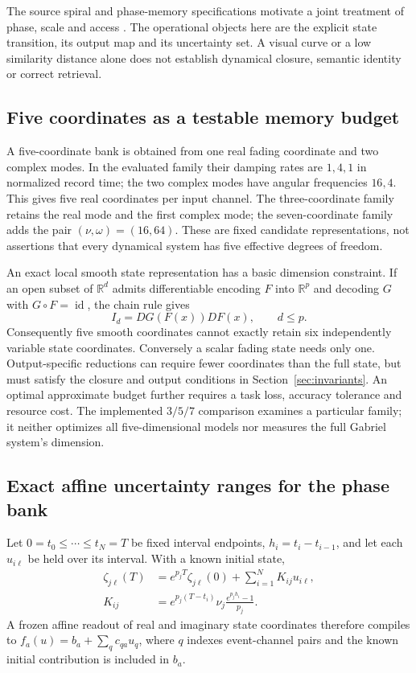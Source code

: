 \documentclass[11pt,a4paper]{article}
\theoremstyle{definition}\newtheorem{definition}[theorem]{Definition}
\newcommand{\R}{\mathbb{R}}
\begin{document}
The source spiral and phase-memory specifications motivate a joint treatment of phase, scale and access \cite{klemm2025oriphiel,klemm2025spiral}. The operational objects here are the explicit state transition, its output map and its uncertainty set. A visual curve or a low similarity distance alone does not establish dynamical closure, semantic identity or correct retrieval.

\subsection{Five coordinates as a testable memory budget}
A five-coordinate bank is obtained from one real fading coordinate and two complex modes. In the evaluated family their damping rates are $1,4,1$ in normalized record time; the two complex modes have angular frequencies $16,4$. This gives five real coordinates per input channel. The three-coordinate family retains the real mode and the first complex mode; the seven-coordinate family adds the pair $(\nu,\omega)=(16,64)$. These are fixed candidate representations, not assertions that every dynamical system has five effective degrees of freedom.

An exact local smooth state representation has a basic dimension constraint. If an open subset of $\R^d$ admits differentiable encoding $F$ into $\R^p$ and decoding $G$ with $G\circ F=\operatorname{id}$, the chain rule gives
\begin{equation}
 I_d=DG(F(x))DF(x),\qquad d\leq p.\label{eq:dimensionbound}
\end{equation}
Consequently five smooth coordinates cannot exactly retain six independently variable state coordinates. Conversely a scalar fading state needs only one. Output-specific reductions can require fewer coordinates than the full state, but must satisfy the closure and output conditions in Section~\ref{sec:invariants}. An optimal approximate budget further requires a task loss, accuracy tolerance and resource cost. The implemented $3/5/7$ comparison examines a particular family; it neither optimizes all five-dimensional models nor measures the full Gabriel system's dimension.

\subsection{Exact affine uncertainty ranges for the phase bank}
Let $0=t_0\leq\cdots\leq t_N=T$ be fixed interval endpoints, $h_i=t_i-t_{i-1}$, and let each $u_{i\ell}$ be held over its interval. With a known initial state,
\begin{align}
 \zeta_{j\ell}(T)&=e^{p_jT}\zeta_{j\ell}(0)+\sum_{i=1}^N K_{ij}u_{i\ell},\\
 K_{ij}&=e^{p_j(T-t_i)}\nu_j\frac{e^{p_jh_i}-1}{p_j}.\label{eq:phasekernel}
\end{align}
A frozen affine readout of real and imaginary state coordinates therefore compiles to $f_a(u)=b_a+\sum_q c_{qa}u_q$, where $q$ indexes event-channel pairs and the known initial contribution is included in $b_a$.
\end{document}

